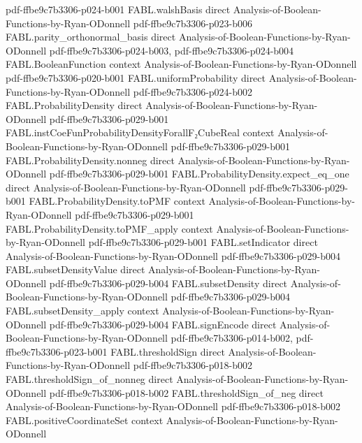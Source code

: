 \begin{theorem}
  {pdf-ffbe9c7b3306-p024-b001}
\proofstep
  {FABL.walshBasis}
  {direct}
  {Analysis-of-Boolean-Functions-by-Ryan-ODonnell}
  {pdf-ffbe9c7b3306-p023-b006}
\proofstep
  {FABL.parity_orthonormal_basis}
  {direct}
  {Analysis-of-Boolean-Functions-by-Ryan-ODonnell}
  {pdf-ffbe9c7b3306-p024-b003,
    pdf-ffbe9c7b3306-p024-b004}
\proofstep
  {FABL.BooleanFunction}
  {context}
  {Analysis-of-Boolean-Functions-by-Ryan-ODonnell}
  {pdf-ffbe9c7b3306-p020-b001}
\proofstep
  {FABL.uniformProbability}
  {direct}
  {Analysis-of-Boolean-Functions-by-Ryan-ODonnell}
  {pdf-ffbe9c7b3306-p024-b002}
\proofstep
  {FABL.ProbabilityDensity}
  {direct}
  {Analysis-of-Boolean-Functions-by-Ryan-ODonnell}
  {pdf-ffbe9c7b3306-p029-b001}
\proofstep
  {FABL.instCoeFunProbabilityDensityForallF₂CubeReal}
  {context}
  {Analysis-of-Boolean-Functions-by-Ryan-ODonnell}
  {pdf-ffbe9c7b3306-p029-b001}
\proofstep
  {FABL.ProbabilityDensity.nonneg}
  {direct}
  {Analysis-of-Boolean-Functions-by-Ryan-ODonnell}
  {pdf-ffbe9c7b3306-p029-b001}
\proofstep
  {FABL.ProbabilityDensity.expect_eq_one}
  {direct}
  {Analysis-of-Boolean-Functions-by-Ryan-ODonnell}
  {pdf-ffbe9c7b3306-p029-b001}
\proofstep
  {FABL.ProbabilityDensity.toPMF}
  {context}
  {Analysis-of-Boolean-Functions-by-Ryan-ODonnell}
  {pdf-ffbe9c7b3306-p029-b001}
\proofstep
  {FABL.ProbabilityDensity.toPMF_apply}
  {context}
  {Analysis-of-Boolean-Functions-by-Ryan-ODonnell}
  {pdf-ffbe9c7b3306-p029-b001}
\proofstep
  {FABL.setIndicator}
  {direct}
  {Analysis-of-Boolean-Functions-by-Ryan-ODonnell}
  {pdf-ffbe9c7b3306-p029-b004}
\proofstep
  {FABL.subsetDensityValue}
  {direct}
  {Analysis-of-Boolean-Functions-by-Ryan-ODonnell}
  {pdf-ffbe9c7b3306-p029-b004}
\proofstep
  {FABL.subsetDensity}
  {direct}
  {Analysis-of-Boolean-Functions-by-Ryan-ODonnell}
  {pdf-ffbe9c7b3306-p029-b004}
\proofstep
  {FABL.subsetDensity_apply}
  {context}
  {Analysis-of-Boolean-Functions-by-Ryan-ODonnell}
  {pdf-ffbe9c7b3306-p029-b004}
\proofstep
  {FABL.signEncode}
  {direct}
  {Analysis-of-Boolean-Functions-by-Ryan-ODonnell}
  {pdf-ffbe9c7b3306-p014-b002,
    pdf-ffbe9c7b3306-p023-b001}
\proofstep
  {FABL.thresholdSign}
  {direct}
  {Analysis-of-Boolean-Functions-by-Ryan-ODonnell}
  {pdf-ffbe9c7b3306-p018-b002}
\proofstep
  {FABL.thresholdSign_of_nonneg}
  {direct}
  {Analysis-of-Boolean-Functions-by-Ryan-ODonnell}
  {pdf-ffbe9c7b3306-p018-b002}
\proofstep
  {FABL.thresholdSign_of_neg}
  {direct}
  {Analysis-of-Boolean-Functions-by-Ryan-ODonnell}
  {pdf-ffbe9c7b3306-p018-b002}
\proofstep
  {FABL.positiveCoordinateSet}
  {context}
  {Analysis-of-Boolean-Functions-by-Ryan-ODonnell}

\end{theorem}
